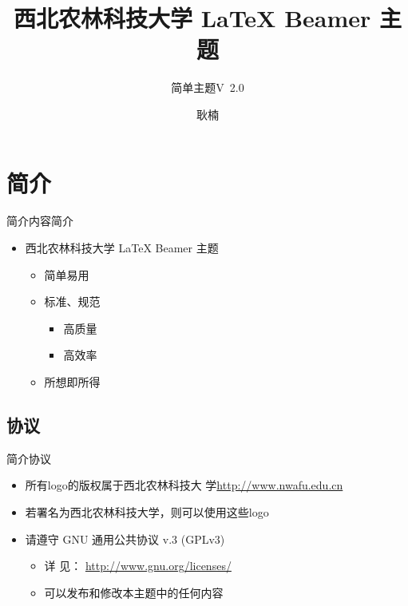 \documentclass[xcolor=svgnames, t, aspectratio=169]{ctexbeamer}
\title[简单主题] %
{西北农林科技大学 {\LaTeX} Beamer 主题}
\subtitle{简单主题V\ 2.0} %
\date{\tosemester} %
\author[N. Geng] %
{耿楠}
\institute[智能媒体] %
{%
  \cie
  
}
\begin{document}
{\nwafuwavesbg%
\begin{frame} %
  \titlepage
\end{frame}
}

\section{简介}
\begin{frame}{简介}{内容简介}
  \begin{itemize}
  \item 西北农林科技大学 {\LaTeX} \alert{Beamer 主题}
    \begin{itemize}
    \item 简单易用
    \item 标准、规范
      \begin{itemize}
      \item 高质量
      \item 高效率
      \end{itemize}
    \item \alert{所想即所得}
    \end{itemize}
  \end{itemize}
\end{frame}

\subsection{协议}
\begin{frame}{简介}{协议}
  \begin{itemize}
  \item 所有logo的版权属于西北农林科技大
    学\href{http://www.nwafu.edu.cn}{http://www.nwafu.edu.cn}
  \item 若署名为西北农林科技大学，则可以使用这些logo
  \item 请遵守 GNU 通用公共协议 v.3 (GPLv3)
    \begin{itemize}
    \item 详
      见：
      \href{http://www.gnu.org/licenses/}{http://www.gnu.org/licenses/}
    \item 可以发布和修改本主题中的任何内容
    \end{itemize}
  \end{itemize}
\end{frame}
\end{document}

